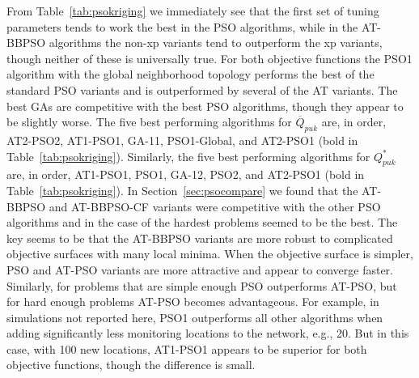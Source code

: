\documentclass[cmbright]{staauth}
\begin{document}
From Table~\ref{tab:psokriging} we immediately see that the first set of tuning parameters tends to work the best in the PSO algorithms, while in the AT-BBPSO algorithms the non-xp variants tend to outperform the xp variants, though neither of these is universally true. For both objective functions the PSO1 algorithm with the global neighborhood topology performs the best of the standard PSO variants and is outperformed by several of the AT variants. The best GAs are competitive with the best PSO algorithms, though they appear to be slightly worse. The five best performing algorithms for $\overline{Q}_{puk}$ are, in order, AT2-PSO2, AT1-PSO1, GA-11, PSO1-Global, and AT2-PSO1 (bold in Table~\ref{tab:psokriging}). Similarly, the five best performing algorithms for $Q^*_{puk}$ are, in order, AT1-PSO1, PSO1, GA-12, PSO2, and AT2-PSO1 (bold in Table~\ref{tab:psokriging}). In Section~\ref{sec:psocompare} we found that the AT-BBPSO and AT-BBPSO-CF variants were competitive with the other PSO algorithms and in the case of the hardest problems seemed to be the best. The key seems to be that the AT-BBPSO variants are more robust to complicated objective surfaces with many local minima. When the objective surface is simpler, PSO and AT-PSO variants are more attractive and appear to converge faster. Similarly, for problems that are simple enough PSO outperforms AT-PSO, but for hard enough problems AT-PSO becomes advantageous. For example, in simulations not reported here, PSO1 outperforms all other algorithms when adding significantly less monitoring locations to the network, e.g., 20. But in this case, with 100 new locations, AT1-PSO1 appears to be superior for both objective functions, though the difference is small.
\end{document}
